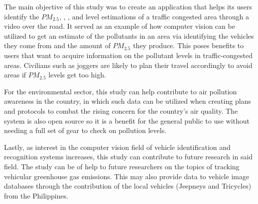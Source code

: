 The main objective of this study was to create an application that helps its users identify the $PM_{2.5}$, , , and  level estimations of a traffic congested area through a video over the road. It served as an example of how computer vision can be utilized to get an estimate of the pollutants in an area via identifying the vehicles they come from and the amount of $PM_{2.5}$ they produce. This poses benefits to users that want to acquire information on the pollutant levels in traffic-congested areas. Civilians such as joggers are likely to plan their travel accordingly to avoid areas if $PM_{2.5}$ levels get too high.

For the environmental sector, this study can help contribute to air pollution awareness in the country, in which such data can be utilized when creating plans and protocols to combat the rising concern for the country’s air quality. The system is also open source so it is a benefit for the general public to use without needing a full set of gear to check on pollution levels.

Lastly, as interest in the computer vision field of vehicle identification and recognition systems increases, this study can contribute to future research in said field. The study can be of help to future researchers on the topics of tracking vehicular greenhouse gas emissions. This may also provide data to vehicle image databases through the contribution of the local vehicles (Jeepneys and Tricycles) from the Philippines.




\begin{comment}
If applicable, describe possible commercialization and/or innovation in your research.
\end{comment}



